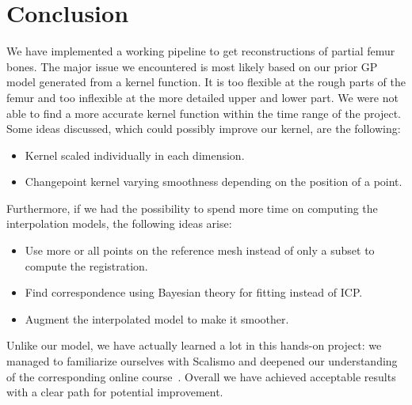 \section{Conclusion}
\label{sec:conclusion}

We have implemented a working pipeline to get reconstructions of partial femur bones.
The major issue we encountered is most likely based on our prior GP model generated from a kernel function.
It is too flexible at the rough parts of the femur and too inflexible at the more detailed upper and lower part.
We were not able to find a more accurate kernel function within the time range of the project.
Some ideas discussed, which could possibly improve our kernel, are the following:
\begin{itemize}
  \item Kernel scaled individually in each dimension.
  \item Changepoint kernel varying smoothness depending on the position of a point.
\end{itemize}

Furthermore, if we had the possibility to spend more time on computing the interpolation models, the following ideas arise:
\begin{itemize}
  \item Use more or all points on the reference mesh instead of only a subset to compute the registration.
  \item Find correspondence using Bayesian theory for fitting instead of ICP.
  \item Augment the interpolated model to make it smoother.
\end{itemize}

Unlike our model, we have actually learned a lot in this hands-on project: we managed to familiarize ourselves with Scalismo and deepened our understanding of the corresponding online course~\cite{mooc2019statistical}.
Overall we have achieved acceptable results with a clear path for potential improvement.